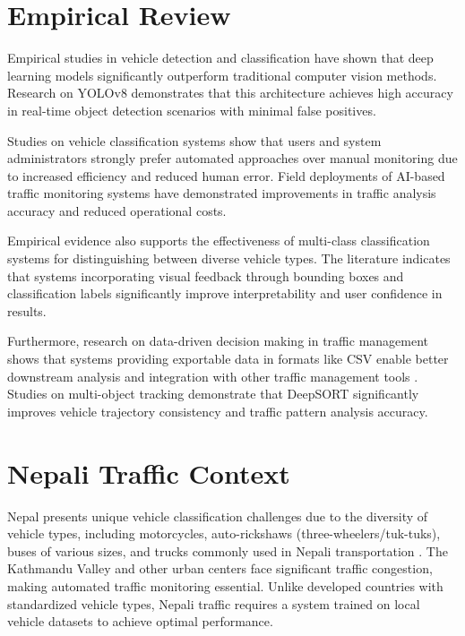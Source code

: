 \documentclass[12pt,a4paper]{report}
\begin{document}
\section{Empirical Review}

Empirical studies in vehicle detection and classification have shown that deep learning models significantly outperform traditional computer vision methods. Research on YOLOv8 \cite{ultralytics2023yolov8} demonstrates that this architecture achieves high accuracy in real-time object detection scenarios with minimal false positives.

Studies on vehicle classification systems show that users and system administrators strongly prefer automated approaches over manual monitoring due to increased efficiency and reduced human error. Field deployments of AI-based traffic monitoring systems \cite{tak2021development} have demonstrated improvements in traffic analysis accuracy and reduced operational costs.

Empirical evidence also supports the effectiveness of multi-class classification systems for distinguishing between diverse vehicle types. The literature indicates that systems incorporating visual feedback through bounding boxes and classification labels significantly improve interpretability and user confidence in results.

Furthermore, research on data-driven decision making in traffic management shows that systems providing exportable data in formats like CSV enable better downstream analysis and integration with other traffic management tools \cite{mckinney2010data}. Studies on multi-object tracking demonstrate that DeepSORT \cite{bewley2016deepsort} significantly improves vehicle trajectory consistency and traffic pattern analysis accuracy.

\section{Nepali Traffic Context}

Nepal presents unique vehicle classification challenges due to the diversity of vehicle types, including motorcycles, auto-rickshaws (three-wheelers/tuk-tuks), buses of various sizes, and trucks commonly used in Nepali transportation \cite{sivaraman2016detecting}. The Kathmandu Valley and other urban centers face significant traffic congestion, making automated traffic monitoring essential. Unlike developed countries with standardized vehicle types, Nepali traffic requires a system trained on local vehicle datasets to achieve optimal performance.
\end{document}
